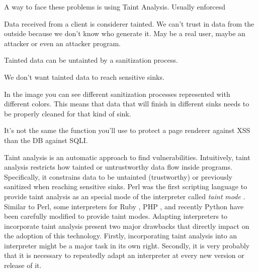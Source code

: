A way to face these problems is using Taint Analysis. Usually enforcesd 

Data received from a client is considerer tainted. We can't trust in data from the outside because we don't know who generate it. May be a real user, maybe an attacker or even an attacker program. 

Tainted data can be untainted by a sanitization process.

We don't want tainted data to reach sensitive sinks.

In the image you can see different sanitization processes represented with different colors. This means that data that will finish in different sinks needs to be properly cleaned for that kind of sink.

It's not the same the function you'll use to protect a page renderer against XSS than the DB against SQLI.

Taint analysis is an automatic approach to find vulnerabilities.
Intuitively, taint analysis restricts how tainted or untrustworthy 
data flow inside programs. Specifically, it constrains data 
to be untainted (trustworthy) 
or previously sanitized when 
reaching sensitive sinks. 
Perl was the first scripting 
language to provide taint analysis 
as an special mode of the  
interpreter called \emph{taint mode} \cite{BekmanCholet2003}. 
Similar to Perl, some interpreters for 
 Ruby \cite{thomas2004prub}, PHP \cite{Nguyen05}, and 
recently Python \cite{KozlovPetukhov07} have been 
carefully modified to provide taint modes.
Adapting interpreters to incorporate taint analysis 
present two major drawbacks that directly 
impact on the adoption of this technology. 
Firstly, incorporating taint analysis into an interpreter 
might be a major task in its own right. Secondly, it is 
very probably that it is necessary to repeatedly adapt an  
interpreter at every new version or release of it.


